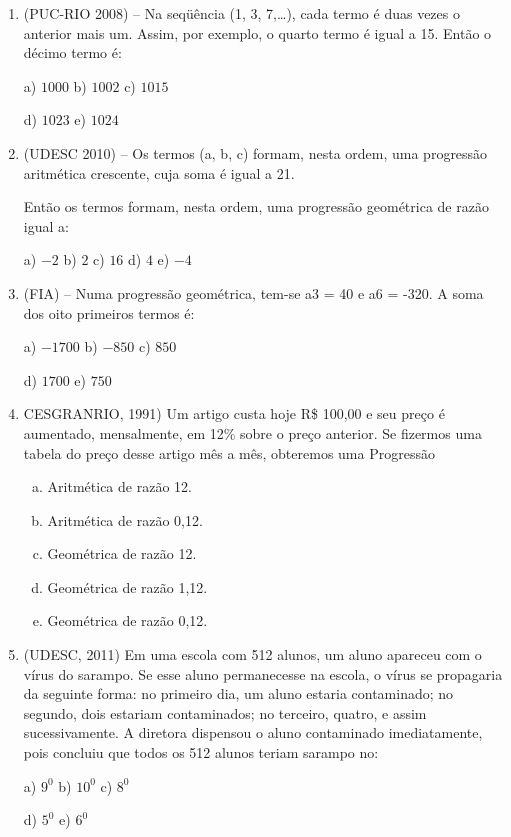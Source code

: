 \begin{multicols*}{2}
\begin{enumerate}[wide, labelwidth=!, labelindent=0pt]
		\item  (PUC-RIO 2008)  --  Na seqüência (1, 3, 7,…), cada termo é duas vezes o anterior mais um. Assim, por exemplo, o quarto termo é igual a 15. Então o décimo termo é:

		      a) $1000 $ b) $1002 $ c) $1015 $

		      d) $1023 $ e) $1024 $

		\item (UDESC 2010)  --  Os termos (a, b, c) formam, nesta ordem, uma progressão aritmética crescente, cuja soma é igual a 21.

		      Então os termos formam, nesta ordem, uma progressão geométrica de razão igual a:

		      a) $-2 $ b) $2 $ c) $16 $ d) $4 $ e) $-4$

		\item (FIA)  --  Numa progressão geométrica, tem-se a3 = 40 e a6 = -320. A soma dos oito primeiros termos é:

		      a) $-1700 $ b) $-850 $ c) $850 $

		      d) $1700 $ e) $750 $

		\item CESGRANRIO, 1991) Um artigo custa hoje R\$ 100,00 e seu preço é aumentado, mensalmente, em 12\% sobre o preço anterior. Se fizermos uma tabela do preço desse artigo mês a mês, obteremos uma Progressão
		\begin{enumerate}[(a)]
			\item Aritmética de razão 12.
			\item Aritmética de razão 0,12.
			\item Geométrica de razão 12.
			\item Geométrica de razão 1,12.
			\item Geométrica de razão 0,12.
		\end{enumerate}

		\item (UDESC, 2011) Em uma escola com 512 alunos, um aluno apareceu com o vírus do sarampo. Se esse aluno permanecesse na escola, o vírus se propagaria da seguinte forma: no primeiro dia, um aluno estaria contaminado; no segundo, dois estariam contaminados; no terceiro, quatro, e assim sucessivamente. A diretora dispensou o aluno contaminado imediatamente, pois concluiu que todos os 512 alunos teriam sarampo no:

		      a) $9^0 $ b) $10^0 $ c) $8^0 $

		      d) $5^0 $ e) $6^0 $


\end{enumerate}
\end{multicols*}
